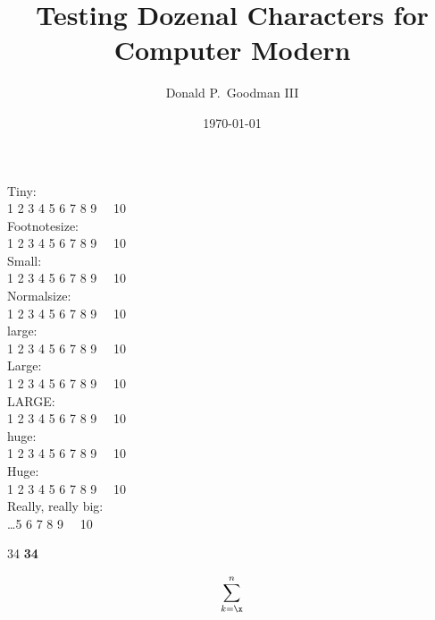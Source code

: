 \documentclass{article}
\title{Testing Dozenal Characters for Computer Modern}
\author{Donald P.\ Goodman III}
\date{\today}
\begin{document}
\maketitle

\mainmatter

\noindent
Tiny: \\
\tiny 1 2 3 4 5 6 7 8 9 \x\ \e\ 10 \\\normalsize
Footnotesize: \\
\footnotesize 1 2 3 4 5 6 7 8 9 \x\ \e\ 10 \\\normalsize
Small: \\
\small 1 2 3 4 5 6 7 8 9 \x\ \e\ 10 \\\normalsize
Normalsize: \\
\normalsize 1 2 3 4 5 6 7 8 9 \x\ \e\ 10 \\\normalsize
large: \\
\large 1 2 3 4 5 6 7 8 9 \x\ \e\ 10 \\\normalsize
Large: \\
\Large 1 2 3 4 5 6 7 8 9 \x\ \e\ 10 \\\normalsize
LARGE: \\
\LARGE 1 2 3 4 5 6 7 8 9 \x\ \e\ 10 \\\normalsize
huge: \\
\huge 1 2 3 4 5 6 7 8 9 \x\ \e\ 10 \\\normalsize
Huge: \\
\Huge 1 2 3 4 5 6 7 8 9 \x\ \e\ 10 \\\normalsize
Really, really big:  \\
\fontsize{50pt}{65pt}\selectfont\ldots 5 6 7 8 9 \x\ \e\
10 \\\normalsize

34
\textbf{34\x5897}

\begin{equation}
\sum_{k=\x}^n
\end{equation}

\clearpage
\end{document}

